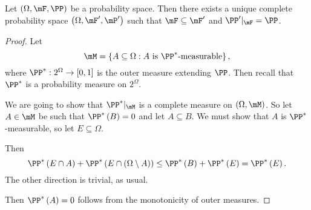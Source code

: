 \documentclass[stat901]{subfiles}
\begin{document}
    \begin{prop}{}
        Let $\left( \Omega,\mF,\PP \right)$ be a probability space. Then there exists a unique complete probability space $\left( \Omega,\mF',\mP' \right)$ such that $\mF\subseteq\mF'$ and $\PP'|_{\mF} = \PP$.
    \end{prop}

    \begin{proof}
        Let
        \begin{equation*}
            \mM = \left\lbrace A\subseteq\Omega:\text{$A$ is $\PP^{*}$-measurable} \right\rbrace,
        \end{equation*}
        where $\PP^{*}:2^{\Omega}\to\left[ 0,1 \right]$ is the outer measure extending $\PP$. Then recall that $\PP^{*}$ is a probability measure on $2^{\Omega}$.

        We are going to show that $\PP^{*}|_{\mM}$ is a complete measure on $\left( \Omega,\mM \right)$. So let $A\in\mM$ be such that $\PP^{*}\left( B \right) = 0$ and let $A\subseteq B$. We must show that $A$ is $\PP^{*}$-measurable, so let $E\subseteq\Omega$.

        Then
        \begin{equation*}
            \PP^{*}\left( E\cap A \right) + \PP^{*}\left( E\cap\left( \Omega\setminus A \right) \right)\leq \PP^{*}\left( B \right) + \PP^{*}\left( E \right) = \PP^{*}\left( E \right).
        \end{equation*}
        The other direction is trivial, as usual.

        Then $\PP^{*}\left( A \right) = 0$ follows from the monotonicity of outer measures.
    \end{proof}

























    
    
    
    
\end{document}
